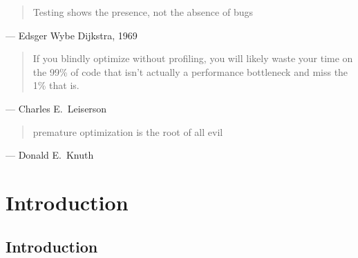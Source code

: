 \begin{quote}
  Testing shows the presence, not the absence of bugs
\end{quote}
\begin{flushright}
  --- Edsger Wybe Dijkstra, 1969~\cite{naur1969software}
\end{flushright}

\begin{quote}
  If you blindly optimize without profiling, you will likely waste your time on the 99\% of code that isn't actually a performance bottleneck and miss the 1\% that is.
\end{quote}
\begin{flushright}
  --- Charles E.~Leiserson~\cite{Profiling2020Leiserson}
\end{flushright}

\begin{quote}
  premature optimization is the root of all evil
\end{quote}
\begin{flushright}
  --- Donald E.~Knuth~\cite[p.~671]{KnuthPrematureOptimization}
\end{flushright}

\chapter{Introduction}\label{ch:intro}

\section{Introduction}\label{sec:intro:intro}

